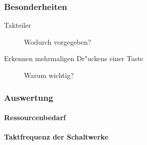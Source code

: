 \documentclass [] {scrartcl}
\begin{document}
  \subsubsection{Besonderheiten}
  \begin{description}
    \item[Takteiler] Wodurch vorgegeben?
    \item[Erkennen mehrmaligen Dr"uckens einer Taste] Warum wichtig?
  \end{description}
  \subsubsection{Auswertung}
  \paragraph{Ressourcenbedarf}
    
  \paragraph{Taktfrequenz der Schaltwerke}
    
\end{document}
